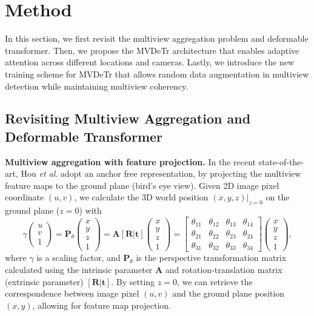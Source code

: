 \documentclass[sigconf,authorversion,nonacm]{acmart}
\newcommand{\etal}{\textit{et al}. }
\begin{document}
\section{Method}
In this section, we first revisit the multiview aggregation problem and deformable transformer. Then, we propose the MVDeTr architecture that enables adaptive attention across different locations and cameras. Lastly, we introduce the new training scheme for MVDeTr that allows random data augmentation in multiview detection while maintaining multiview coherency. 


\subsection{Revisiting Multiview Aggregation and Deformable Transformer}

\textbf{Multiview aggregation with feature projection.} In the recent state-of-the-art, Hou \etal \cite{hou2020multiview} adopt an anchor free representation, by projecting the multiview feature maps to the ground plane (bird's eye view). Given 2D image pixel coordinate $\left(u,v\right)$, we calculate the 3D world position $\left(x,y,z\right)\big\rvert_{z=0}$ on the ground plane ($z=0$) with 
\begin{equation}
\label{eq:perspective_3x4}
    \gamma\left(\begin{matrix}u \\ v \\ 1\end{matrix}\right) = \bm{P}_\theta\left(\begin{matrix} x \\ y \\ z \\ 1\end{matrix}\right) = \bm{A} \left[\bm{R}|\bm{t}\right] \left(\begin{matrix} x \\ y \\ z \\ 1\end{matrix}\right) = \left[\begin{matrix} \theta_{11} & \theta_{12} & \theta_{13} & \theta_{14} \\ \theta_{21} & \theta_{22} & \theta_{23} & \theta_{24} \\ \theta_{31} & \theta_{32} & \theta_{33} & \theta_{34} \end{matrix}\right] \left(\begin{matrix} x \\ y \\ z \\ 1\end{matrix}\right),
\end{equation}
where $\gamma$ is a scaling factor, and $\bm{P}_\theta$ is the perspective transformation matrix calculated using the intrinsic parameter $\bm{A}$ and rotation-translation matrix (extrinsic parameter) $\left[\bm{R}|\bm{t}\right]$. By setting $z=0$, we can retrieve the correspondence between image pixel $\left(u,v\right)$ and the ground plane position $\left(x,y\right)$, allowing for feature map projection. 
\end{document}
